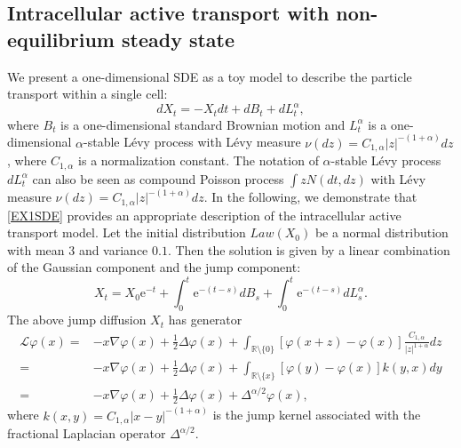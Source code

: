 \documentclass[10pt]{article}
\theoremstyle{definition}
\numberwithin{equation}{section}
\begin{document}
\subsection{Intracellular active transport with non-equilibrium steady state}

We present a one-dimensional SDE as a toy model to describe the  particle transport within a single cell:
\begin{equation}\label{EX1SDE}
dX_t = -X_tdt + dB_t + dL^{\alpha}_t, 
\end{equation}
where $B_t$ is a one-dimensional standard Brownian motion and $L^{\alpha}_t$ is a one-dimensional $\alpha$-stable L\'{e}vy process with L\'{e}vy measure $\nu(dz) = C_{1,\alpha}|z|^{-(1+\alpha)}dz$, where $C_{1,\alpha}$ is a normalization constant. The notation of $\alpha$-stable L\'{e}vy process $dL^{\alpha}_t$ can also be seen as compound Poisson process $\int z N(dt,dz)$ with L\'{e}vy measure $\nu(dz) = C_{1,\alpha}|z|^{-(1+\alpha)}dz$. In the following, we demonstrate that \eqref{EX1SDE} provides an appropriate description of the intracellular active transport model. Let the initial distribution $Law(X_0)$ be a normal distribution with mean $3$ and variance $0.1$. Then the solution is given by a linear combination of the Gaussian component and the jump component:
\begin{equation*}
    X_t = X_0\mathrm{e}^{-t} + \int_0^t \mathrm{e}^{-(t-s)}dB_s + \int_0^t \mathrm{e}^{-(t-s)}dL^{\alpha}_s.
\end{equation*}
The above jump diffusion $X_t$ has generator
\begin{align*}
  \mathcal{L}\varphi(x)
  = & -x \nabla\varphi(x) + \frac{1}{2}\Delta \varphi(x) + \int_{\mathbb{R}\setminus\{0\}} [\varphi(x+z) - \varphi(x)]\frac{C_{1,\alpha}}{|z|^{1+\alpha}}dz \\
  = & -x \nabla\varphi(x) + \frac{1}{2}\Delta\varphi(x) + \int_{\mathbb{R} \setminus \{x\}} [\varphi(y) - \varphi(x)] k(y,x)dy \\
  = & -x \nabla\varphi(x) + \frac{1}{2}\Delta\varphi(x) + \Delta^{\alpha/2}\varphi(x),
\end{align*}
where $k(x,y) = C_{1,\alpha}|x-y|^{-(1+\alpha)}$ is the jump kernel associated with the fractional Laplacian operator $\Delta^{\alpha/2}$.
\end{document}
